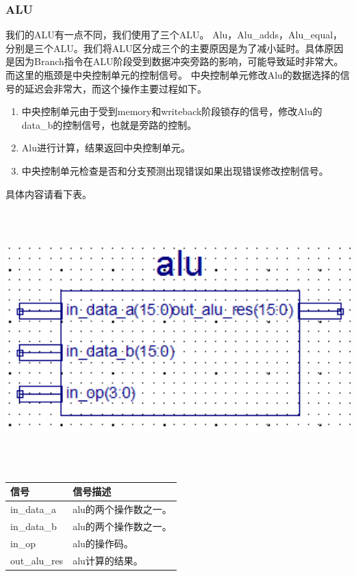 \subsubsection{ALU}
    我们的ALU有一点不同，我们使用了三个ALU。
    Alu，Alu\_adds，Alu\_equal，分别是三个ALU。我们将ALU区分成三个的主要原因是为了减小延时。具体原因是因为Branch指令在ALU阶段受到数据冲突旁路的影响，可能导致延时非常大。而这里的瓶颈是中央控制单元的控制信号。
    中央控制单元修改Alu的数据选择的信号的延迟会非常大，而这个操作主要过程如下。
    \begin{enumerate}
        \item 中央控制单元由于受到memory和writeback阶段锁存的信号，修改Alu的data\_b的控制信号，也就是旁路的控制。
        \item Alu进行计算，结果返回中央控制单元。
        \item 中央控制单元检查是否和分支预测出现错误如果出现错误修改控制信号。
    \end{enumerate}
    具体内容请看下表。

\begin{center}
    \includegraphics[height=10cm]{image/detail/detail_alu.png}
    \label{fig:alu}
\end{center}
\begin{center}
    \label{table:alu}
    \begin{longtable}{p{}p{}}
        \toprule
        信号 & 信号描述 \\
        \midrule
            in\_data\_a & alu的两个操作数之一。\\
            in\_data\_b & alu的两个操作数之一。\\
            in\_op & alu的操作码。\\
            out\_alu\_res & alu计算的结果。\\
        \bottomrule
    \end{longtable}
\end{center}


